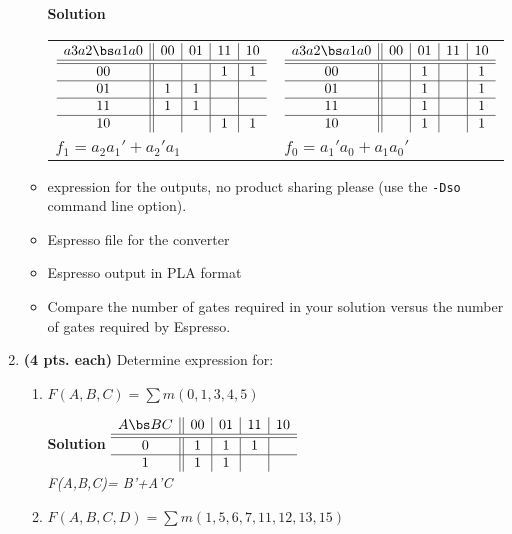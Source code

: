 \begin{enumerate}
\begin{itemize}
\begin{onlysolution}  \textbf{Solution} \itshape{
\begin{tabular}{ll}
$\begin{array} {c||c|c|c|c}
 a3 a2 \bs a1 a0 & 00 & 01 & 11 & 10 \\ \hline \hline
       00        &    &    & 1  & 1  \\ \hline
       01        & 1  & 1  &    &    \\ \hline
       11        & 1  & 1  &    &    \\ \hline
       10        &    &    & 1  & 1  \\
\end{array}$ &
$\begin{array} {c||c|c|c|c}
 a3 a2 \bs a1 a0 & 00 & 01 & 11 & 10 \\ \hline \hline
       00        &    & 1  &    & 1  \\ \hline
       01        &    & 1  &    & 1  \\ \hline
       11        &    & 1  &    & 1  \\ \hline
       10        &    & 1  &    & 1  \\
\end{array}$ \\
$f_1 = a_2a_1'+a_2'a_1$ & $f_0 = a_1'a_0+a_1a_0'$ \\
\end{tabular}
} \end{onlysolution} 

\item \SOPmin expression for the outputs, no product sharing please
(use the \verb+-Dso+ command line option).
\item Espresso file for the converter
\item Espresso output in PLA format
\item Compare the number of gates required in your solution
versus the number of gates required by Espresso.
\end{itemize}

\item \textbf{ (4 pts. each)} Determine \SOPmin expression for:
\begin{enumerate}
\item $F(A,B,C)=\sum m(0,1,3,4,5)$

\begin{onlysolution}  \textbf{Solution} \itshape{
$\begin{array} {c||c|c|c|c}
   A   \bs B C  & 00 & 01 & 11 & 10 \\ \hline \hline
       0        &  1 & 1  & 1  &    \\ \hline
       1        &  1 & 1  &    &    \\ 
\end{array}$ \\
F(A,B,C)= B'+A'C
} \end{onlysolution} 
\item $F(A,B,C,D)=\sum m(1,5,6,7,11,12,13,15)$


\end{enumerate}
\end{enumerate}
